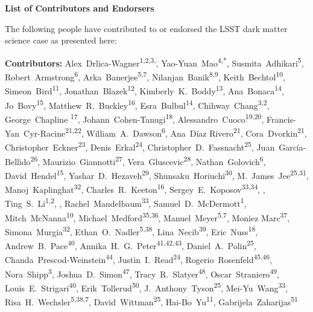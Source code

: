 
\begin{center}
  {\Large \bf List of Contributors and Endorsers}
\end{center}
\bigskip

The following people have contributed to or endorsed the LSST dark matter science case as presented here:

\def\altaffilmark#1{\textsuperscript{#1}}
\def\affil#1{\noindent #1 \\}

\normalsize
\begin{raggedright}
\textbf{Contributors:}
Alex~Drlica-Wagner\altaffilmark{1,2,3,\textdagger},
Yao-Yuan~Mao\altaffilmark{4,*},
Susmita~Adhikari\altaffilmark{5},
Robert~Armstrong\altaffilmark{6},
Arka~Banerjee\altaffilmark{5,7},
Nilanjan~Banik\altaffilmark{8,9},
Keith~Bechtol\altaffilmark{10},
Simeon~Bird\altaffilmark{11},
Jonathan~Blazek\altaffilmark{12},
Kimberly~K.~Boddy\altaffilmark{13},
Ana~Bonaca\altaffilmark{14},
Jo~Bovy\altaffilmark{15},
Matthew~R.~Buckley\altaffilmark{16},
Esra~Bulbul\altaffilmark{14},
Chihway~Chang\altaffilmark{3,2},
George~Chapline \altaffilmark{17},
Johann~Cohen-Tanugi\altaffilmark{18},
Alessandro~Cuoco\altaffilmark{19,20},
Francis-Yan~Cyr-Racine\altaffilmark{21,22},
William~A.~Dawson\altaffilmark{6},
Ana~D\'{i}az Rivero\altaffilmark{21},
Cora~Dvorkin\altaffilmark{21},
Christopher~Eckner\altaffilmark{23},
Denis~Erkal\altaffilmark{24},
Christopher~D.~Fassnacht\altaffilmark{25},
Juan~Garc\'ia-Bellido\altaffilmark{26},
Maurizio~Giannotti\altaffilmark{27},
Vera~Gluscevic\altaffilmark{28},
Nathan~Golovich\altaffilmark{6},
David~Hendel\altaffilmark{15},
Yashar~D.~Hezaveh\altaffilmark{29},
Shunsaku~Horiuchi\altaffilmark{30},
M.~James~Jee\altaffilmark{25,31},
Manoj~Kaplinghat\altaffilmark{32},
Charles~R.~Keeton\altaffilmark{16},
Sergey~E.~Koposov\altaffilmark{33,34},
\NEW{Casey~Lam\altaffilmark{35}},
Ting~S.~Li\altaffilmark{1,2},
\NEW{Jessica~R.~Lu\altaffilmark{35}},
Rachel~Mandelbaum\altaffilmark{33},
Samuel~D.~McDermott\altaffilmark{1},
Mitch~McNanna\altaffilmark{10},
Michael~Medford\altaffilmark{35,36},
Manuel~Meyer\altaffilmark{5,7},
Moniez Marc\altaffilmark{37},
Simona~Murgia\altaffilmark{32},
Ethan~O.~Nadler\altaffilmark{5,38},
Lina~Necib\altaffilmark{39},
Eric~Nuss\altaffilmark{18},
Andrew~B.~Pace\altaffilmark{40},
Annika~H.~G.~Peter\altaffilmark{41,42,43},
Daniel~A.~Polin\altaffilmark{25},
Chanda~Prescod-Weinstein\altaffilmark{44},
Justin~I.~Read\altaffilmark{24},
Rogerio~Rosenfeld\altaffilmark{45,46},
Nora~Shipp\altaffilmark{3},
Joshua~D.~Simon\altaffilmark{47},
Tracy~R.~Slatyer\altaffilmark{48},
Oscar~Straniero\altaffilmark{49},
Louis~E.~Strigari\altaffilmark{40},
Erik~Tollerud\altaffilmark{50},
J.~Anthony~Tyson\altaffilmark{25},
Mei-Yu~Wang\altaffilmark{33},
Risa~H.~Wechsler\altaffilmark{5,38,7},
David~Wittman\altaffilmark{25},
Hai-Bo~Yu\altaffilmark{11},
Gabrijela~Zaharijas\altaffilmark{51}


\end{raggedright}
